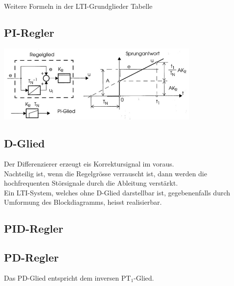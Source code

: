 		Weitere Formeln in der LTI-Grundglieder Tabelle

	\subsection{PI-Regler }
		\includegraphics[width=10cm]{./images/PI_Regler.jpg} \\
		\qquad
		\qquad

	\subsection{D-Glied }
		Der Differenzierer erzeugt eis Korrektursignal im voraus.\\
		Nachteilig ist, wenn die Regelgrösse verrauscht ist, dann werden die
		hochfrequenten Störsignale durch die Ableitung verstärkt.\\
		Ein LTI-System, welches ohne D-Glied darstellbar ist, gegebenenfalls durch
		Umformung des Blockdiagramms, heisst realisierbar.

	\subsection{PID-Regler  }

	\subsection{PD-Regler  }
		 \qquad
		Das PD-Glied entspricht dem inversen PT$_1$-Glied.


